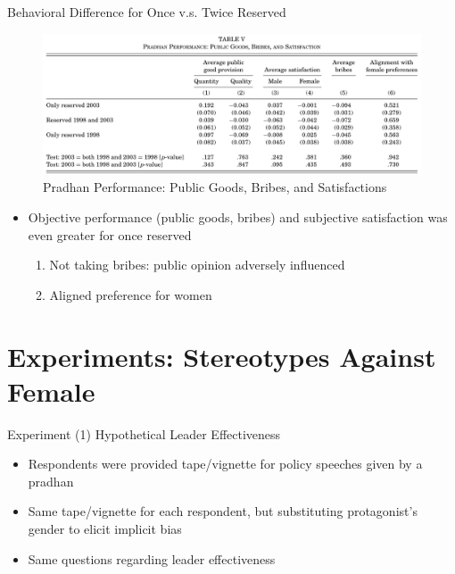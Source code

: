 \documentclass[
  10pt,
  ignorenonframetext,
  aspectratio=43,
]{beamer}
\providecommand{\tightlist}{%
  \setlength{\itemsep}{0pt}\setlength{\parskip}{0pt}}
\begin{document}
\begin{frame}{Behavioral Difference for Once v.s. Twice Reserved}
\protect\hypertarget{behavioral-difference-for-once-v.s.-twice-reserved}{}
\begin{figure}
\centering
\includegraphics{20220523-qje-beaman-duflo-powerful-women.assets/table5-public goods performance.png}
\caption{Pradhan Performance: Public Goods, Bribes, and Satisfactions}
\end{figure}

\begin{itemize}
\tightlist
\item
  Objective performance (public goods, bribes) and subjective
  satisfaction was even greater for once reserved

  \begin{enumerate}
  \tightlist
  \item
    Not taking bribes: public opinion adversely influenced
  \item
    Aligned preference for women
  \end{enumerate}
\end{itemize}
\end{frame}

\hypertarget{experiments-stereotypes-against-female}{%
\section{Experiments: Stereotypes Against
Female}\label{experiments-stereotypes-against-female}}

\begin{frame}{Experiment (1) Hypothetical Leader Effectiveness}
\protect\hypertarget{experiment-1-hypothetical-leader-effectiveness}{}
\begin{itemize}
\tightlist
\item
  Respondents were provided tape/vignette for policy speeches given by a
  pradhan
\item
  Same tape/vignette for each respondent, but substituting protagonist's
  gender to elicit implicit bias
\item
  Same questions regarding leader effectiveness
\end{itemize}
\end{frame}
\end{document}
